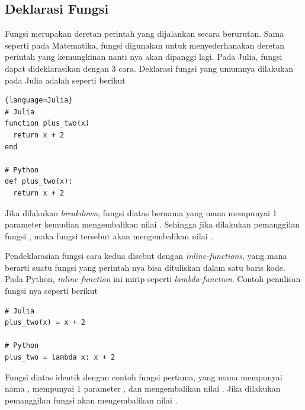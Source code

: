 


\subsection{Deklarasi Fungsi}

Fungsi merupakan deretan perintah yang dijalankan secara berurutan. Sama
seperti pada Matematika, fungsi digunakan untuk menyederhanakan deretan
perintah yang kemungkinan nanti nya akan dipanggi lagi. Pada Julia, fungsi
dapat dideklarasikan dengan 3 cara. Deklarasi fungsi yang umumnya dilakukan
pada Julia adalah seperti berikut

\begin{lstlisting}[label={contoh deklarasi fungsi 1}]{language=Julia}
# Julia
function plus_two(x)
  return x + 2
end

# Python
def plus_two(x):
  return x + 2
\end{lstlisting}

\noindent
Jika dilakukan \emph{breakdown}, fungsi diatas bernama  yang mana mempunyai
1 parameter  kemudian mengembalikan nilai . Sehingga jika
dilakukan pemanggilan fungsi , maka fungsi tersebut akan
mengembalikan nilai .

Pendeklarasian fungsi cara kedua disebut dengan \emph{inline-functions}, yang
mana berarti suatu fungsi yang perintah nya bisa dituliskan dalam satu baris
kode. Pada Python, \emph{inline-function} ini mirip seperti
\emph{lambda-function}. Contoh penulisan fungsi nya seperti berikut

\begin{lstlisting}[label={contoh deklarasi fungsi 2}]
# Julia
plus_two(x) = x + 2

# Python
plus_two = lambda x: x + 2
\end{lstlisting}

\noindent
Fungsi diatas identik dengan contoh fungsi pertama, yang mana mempunyai nama ,
mempunyai 1 parameter , dan mengembalikan nilai . Jika dilakukan
pemanggilan fungsi  akan mengembalikan nilai .

